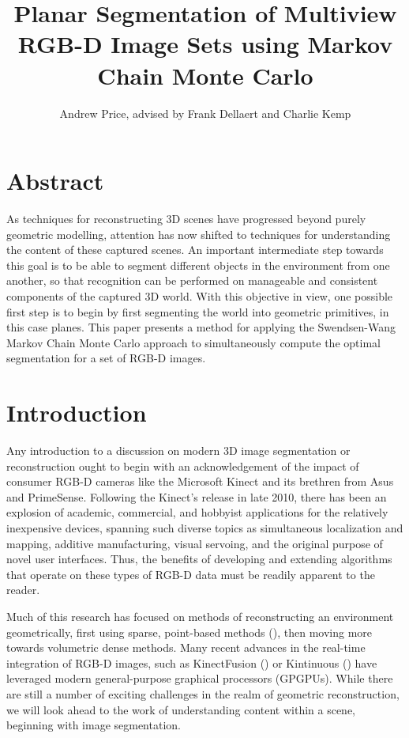 \documentclass[10pt,letterpaper]{article}
\author{Andrew Price, advised by Frank Dellaert and Charlie Kemp}
\title{Planar Segmentation of Multiview RGB-D Image Sets using Markov Chain Monte Carlo }
\date{}
\begin{document}
\maketitle

\section{Abstract}
	As techniques for reconstructing 3D scenes have progressed beyond purely geometric modelling, attention has now shifted to techniques for understanding the content of these captured scenes. An important intermediate step towards this goal is to be able to segment different objects in the environment from one another, so that recognition can be performed on manageable and consistent components of the captured 3D world. With this objective in view, one possible first step is to begin by first segmenting the world into geometric primitives, in this case planes. This paper presents a method for applying the Swendsen-Wang Markov Chain Monte Carlo approach to simultaneously compute the optimal segmentation for a set of RGB-D images.
	
\section{Introduction}
	Any introduction to a discussion on modern 3D image segmentation or reconstruction ought to begin with an acknowledgement of the impact of consumer RGB-D cameras like the Microsoft Kinect and its brethren from Asus and PrimeSense. Following the Kinect's release in late 2010, there has been an explosion of academic, commercial, and hobbyist applications for the relatively inexpensive devices, spanning such diverse topics as simultaneous localization and mapping, additive manufacturing, visual servoing, and the original purpose of novel user interfaces. Thus, the benefits of developing and extending algorithms that operate on these types of RGB-D data must be readily apparent to the reader.
	
	Much of this research has focused on methods of reconstructing an environment geometrically, first using sparse, point-based methods (\cite{henry2010rgb}), then moving more towards volumetric dense methods. Many recent advances in the real-time integration of RGB-D images, such as KinectFusion (\cite{newcombe2011kinectfusion}) or Kintinuous (\cite{whelan2012kintinuous}) have leveraged modern general-purpose graphical processors (GPGPUs). While there are still a number of exciting challenges in the realm of geometric reconstruction, we will look ahead to the work of understanding content within a scene, beginning with image segmentation.
	
\end{document}
